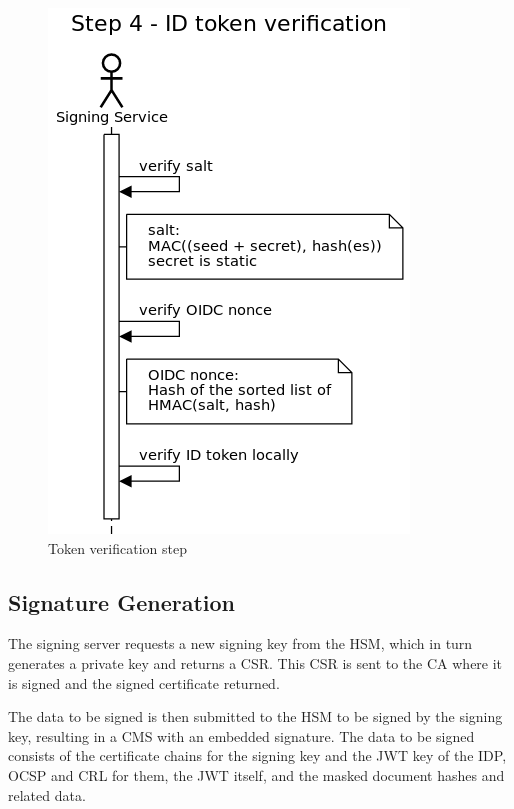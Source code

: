 \begin{figure}
    \begin{center}
        \includegraphics[scale=0.5]{images/protocol_step4_id_token_verification.png}
        \caption{Token verification step}
        \label{fig:tokenverificationstep}
    \end{center}
\end{figure}

\subsection{Signature Generation}\label{subsec:signature-generation}
The signing server requests a new signing key from the \gls{HSM}, which in turn generates a private key and returns a \gls{CSR}.
This \gls{CSR} is sent to the \gls{CA} where it is signed and the signed certificate returned.

The data to be signed is then submitted to the \gls{HSM} to be signed by the signing key,
resulting in a \gls{CMS} with an embedded signature.
The data to be signed consists of the certificate chains for the signing key and the \gls{JWT} key  of the \gls{IDP},
\gls{OCSP} and \gls{CRL} for them,
the \gls{JWT} itself,
and the masked document hashes and related data.

